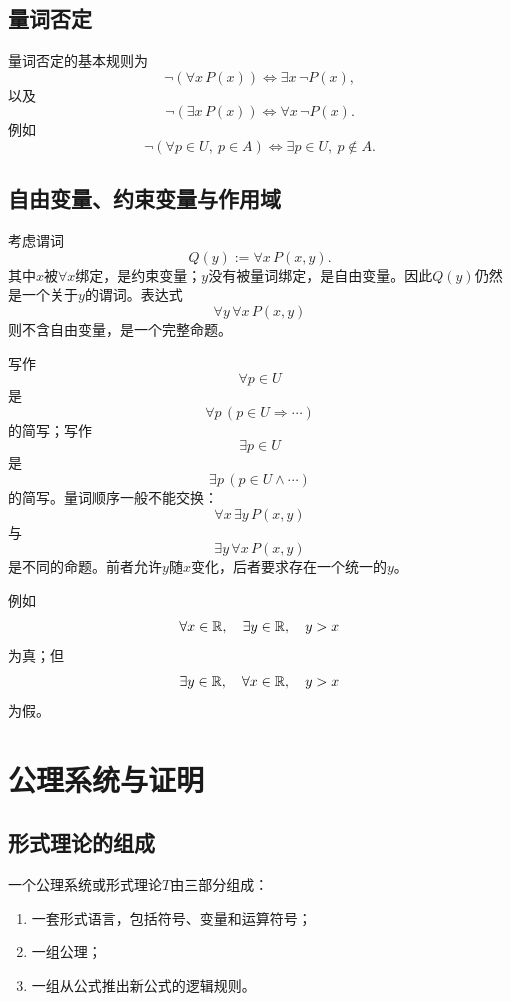 \subsection{量词否定}

量词否定的基本规则为
\[
    \boxed{
    \neg(\forall x\,P(x))
    \Longleftrightarrow
    \exists x\,\neg P(x),
    }
\]
以及
\[
    \boxed{
    \neg(\exists x\,P(x))
    \Longleftrightarrow
    \forall x\,\neg P(x).
    }
\]
例如
\[
    \neg(\forall p\in U,\ p\in A)
    \Longleftrightarrow
    \exists p\in U,\ p\notin A.
\]

\subsection{自由变量、约束变量与作用域}

考虑谓词
\[
    Q(y):=\forall x\,P(x,y).
\]
其中$x$被$\forall x$绑定，是约束变量；$y$没有被量词绑定，是自由变量。因此$Q(y)$仍然是一个关于$y$的谓词。表达式
\[
    \forall y\,\forall x\,P(x,y)
\]
则不含自由变量，是一个完整命题。

写作
\[
    \forall p\in U
\]
是
\[
    \forall p\,(p\in U\Rightarrow\cdots)
\]
的简写；写作
\[
    \exists p\in U
\]
是
\[
    \exists p\,(p\in U\land\cdots)
\]
的简写。量词顺序一般不能交换：
\[
    \forall x\,\exists y\,P(x,y)
\]
与
\[
    \exists y\,\forall x\,P(x,y)
\]
是不同的命题。前者允许$y$随$x$变化，后者要求存在一个统一的$y$。

例如
\[
    \forall x\in\mathbb{R},\quad
    \exists y\in\mathbb{R},\quad y>x
\]
为真；但
\[
    \exists y\in\mathbb{R},\quad
    \forall x\in\mathbb{R},\quad y>x
\]
为假。


\section{公理系统与证明}

\subsection{形式理论的组成}

一个公理系统或形式理论$T$由三部分组成：
\begin{enumerate}
    \item 一套形式语言，包括符号、变量和运算符号；
    \item 一组公理；
    \item 一组从公式推出新公式的逻辑规则。
\end{enumerate}

